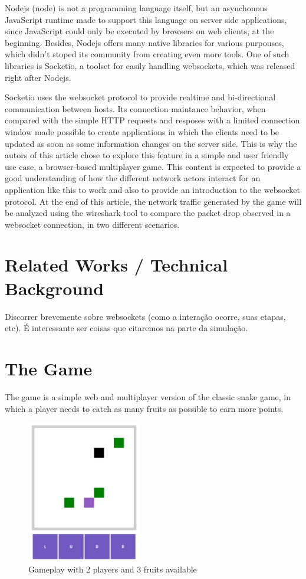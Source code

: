 \documentclass[english]{sbrt}
\begin{document}
Nodejs (node) is not a programming language itself, but an asynchonous JavaScript runtime made to support this language on server side applications, since JavaScript could
only be executed by browsers on web clients, at the beginning. Besides, Nodejs offers many native libraries for various purpouses, which didn't stoped its community
from creating even more tools. One of such libraries is Socketio, a toolset for easily handling websockets, which was released right after Nodejs.

Socketio uses the websocket protocol to provide realtime and bi-directional communication between hosts. Its connection maintance behavior, when compared with the simple HTTP requests and resposes
with a limited connection window made possible to create applications in which the clients need to be updated as soon as some information changes on the server side. This is why the autors of
this article chose to explore this feature in a simple and user friendly use case, a browser-based multiplayer game. This content is expected to provide a good understanding of how the different network
actors interact for an application like this to work and also to provide an introduction to the websocket protocol. At the end of this article, the network traffic generated by the game will be analyzed 
using the wireshark tool to compare the packet drop observed in a websocket connection, in two different scenarios.


\section{\textbf{Related Works / Technical Background}}
Discorrer brevemente sobre websockets (como a interação ocorre, suas etapas, etc). É interessante ser coisas que citaremos na parte da simulação.

\section{\textbf{The Game}}
The game is a simple web and multiplayer version of the classic snake game, in which a player needs to
catch as many fruits as possible to earn more points.

\begin{figure}[H]
  \centering
  \includegraphics[width=5cm]{game-screen.jpg}
  \caption{Gameplay with 2 players and 3 fruits available}
  \label{game-screen}
\end{figure}
\end{document}
